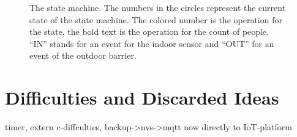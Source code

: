 \begin{figure}%
    \centering
    \resizebox{1\textwidth}{!}{
        
    }
    \caption[The used state machine]{The state machine. The numbers in the circles represent the current state
        of the state machine. The colored number is the operation for the state, the bold text is the operation
        for the count of people. ``IN'' stands for an event for the indoor sensor and ``OUT'' for an event
        of the outdoor barrier.}
    \label{fig_stateMachine}
\end{figure}




\section{Difficulties and Discarded Ideas}\label{diff_and_ideas}

timer, extern c-diffculties, backup->nvs->mqtt now directly to IoT-platform